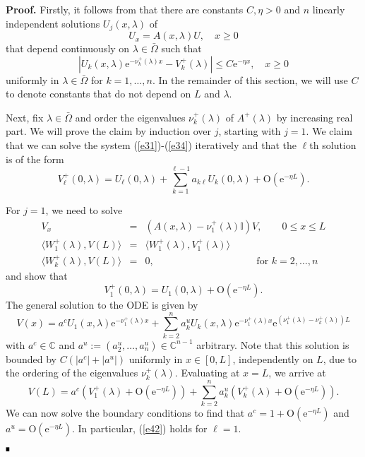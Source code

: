 \documentclass[10pt]{article}
\newenvironment{Proof}[1][.]%
 {\begin{trivlist}\item[]\textbf{Proof#1 }}%
 {\hspace*{\fill}$\rule{0.3\baselineskip}{0.35\baselineskip}$\end{trivlist}}
\numberwithin{equation}{section}
\def\id{\mathbb{I}}
\newcommand{\C}{\mathbb{C}}
\newcommand{\rme}{\mathrm{e}}
\newcommand{\rmO}{\mathrm{O}}
\begin{document}
\begin{Proof}
Firstly, it follows from \citep[Ch.~3 \S8]{CodLev} that there are constants $C,\eta>0$ and $n$ linearly independent solutions $U_j(x,\lambda)$ of
\[
U_x = A(x,\lambda) U, \quad x\geq0
\]
that depend continuously on $\lambda\in\bar\Omega$ such that
\begin{equation}\label{e41}
|U_k(x,\lambda) \rme^{-\nu^+_k(\lambda)x} - V^+_k(\lambda)| \leq C \rme^{-\eta x}, \quad x\geq0
\end{equation}
uniformly in $\lambda\in\bar\Omega$ for $k=1,\ldots,n$. In the remainder of this section, we will use $C$ to denote constants that do not depend on $L$ and $\lambda$.

Next, fix $\lambda\in\bar\Omega$ and order the eigenvalues $\nu^+_k(\lambda)$ of $A^+(\lambda)$ by increasing real part. We will prove the claim by induction over $j$, starting with $j=1$. We claim that we can solve the system (\ref{e31})-(\ref{e34}) iteratively and that the $\ell$th solution is of the form
\begin{equation}\label{e42}
V^+_\ell(0,\lambda) = U_\ell(0,\lambda) + \sum_{k=1}^{\ell-1} a_{k\ell} U_k(0,\lambda) + \rmO(\rme^{-\eta L}).
\end{equation}

For $j=1$, we need to solve
\begin{eqnarray*}
V_x & = & (A(x,\lambda)-\nu^+_1(\lambda)\id)V, \qquad 0\le x\leq L \\
\langle W^+_1(\lambda),V(L)\rangle & = & \langle W^+_1(\lambda),V^+_1(\lambda)\rangle \\
\langle W^+_k(\lambda),V(L)\rangle & = & 0, \qquad\qquad\qquad\qquad\qquad \mbox{ for } k=2,\ldots,n
\end{eqnarray*}
and show that
\[
V^+_1(0,\lambda) = U_1(0,\lambda) + \rmO(\rme^{-\eta L}).
\]
The general solution to the ODE is given by
\[
V(x) = a^c U_1(x,\lambda) \rme^{-\nu^+_1(\lambda)x} + \sum_{k=2}^{n} a^u_k U_k(x,\lambda)
\rme^{-\nu^+_1(\lambda)x} \rme^{(\nu^+_1(\lambda)-\nu^+_k(\lambda))L}
\]
with $a^c\in\C$ and $a^u:=(a^u_2,\ldots,a^u_n)\in\C^{n-1}$ arbitrary. Note that this solution is bounded by $C(|a^c|+|a^u|)$ uniformly in $x\in[0,L]$, independently on $L$, due to the ordering of the eigenvalues $\nu^+_k(\lambda)$. Evaluating at $x=L$, we arrive at
\[
V(L) = a^c (V^+_1(\lambda)+\rmO(\rme^{-\eta L})) + \sum_{k=2}^{n} a^u_k (V^+_k(\lambda)+\rmO(\rme^{-\eta L})).
\]
We can now solve the boundary conditions to find that $a^c=1+\rmO(\rme^{-\eta L})$ and $a^u=\rmO(\rme^{-\eta L})$. In particular, (\ref{e42}) holds for $\ell=1$.


\end{Proof}
\end{document}
